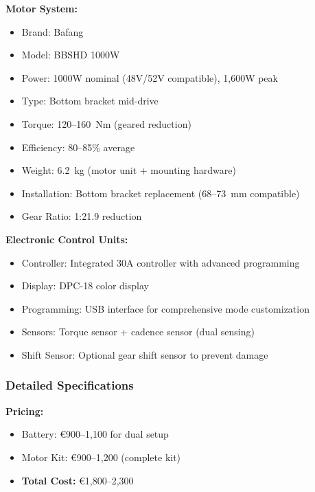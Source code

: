 \documentclass[12pt,a4paper]{article}
\begin{document}
\textbf{Motor System:}
\begin{itemize}
    \item Brand: Bafang
    \item Model: BBSHD 1000W \cite{bafang-bbshd}
    \item Power: 1000W nominal (48V/52V compatible), 1,600W peak
    \item Type: Bottom bracket mid-drive
    \item Torque: 120--160~Nm (geared reduction)
    \item Efficiency: 80--85\% average
    \item Weight: 6.2~kg (motor unit + mounting hardware)
    \item Installation: Bottom bracket replacement (68--73~mm compatible)
    \item Gear Ratio: 1:21.9 reduction
\end{itemize}

\textbf{Electronic Control Units:}
\begin{itemize}
    \item Controller: Integrated 30A controller with advanced programming
    \item Display: DPC-18 color display
    \item Programming: USB interface for comprehensive mode customization
    \item Sensors: Torque sensor + cadence sensor (dual sensing)
    \item Shift Sensor: Optional gear shift sensor to prevent damage
\end{itemize}

\subsubsection{Detailed Specifications}

\textbf{Pricing:}
\begin{itemize}
    \item Battery: €900--1,100 for dual setup \cite{aliexpress-batteries}
    \item Motor Kit: €900--1,200 (complete kit) \cite{aliexpress-batteries}
    \item \textbf{Total Cost:} €1,800--2,300
\end{itemize}
\end{document}
